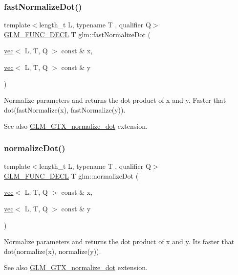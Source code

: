 \subsubsection{\texorpdfstring{fast\+Normalize\+Dot()}{fastNormalizeDot()}}
{\footnotesize\ttfamily template$<$length\+\_\+t L, typename T , qualifier Q$>$ \\
\mbox{\hyperlink{setup_8hpp_ab2d052de21a70539923e9bcbf6e83a51}{G\+L\+M\+\_\+\+F\+U\+N\+C\+\_\+\+D\+E\+CL}} T glm\+::fast\+Normalize\+Dot (\begin{DoxyParamCaption}\item[{\mbox{\hyperlink{structglm_1_1vec}{vec}}$<$ L, T, Q $>$ const \&}]{x,  }\item[{\mbox{\hyperlink{structglm_1_1vec}{vec}}$<$ L, T, Q $>$ const \&}]{y }\end{DoxyParamCaption})}

Normalize parameters and returns the dot product of x and y. Faster that dot(fast\+Normalize(x), fast\+Normalize(y)).

\begin{DoxySeeAlso}{See also}
\mbox{\hyperlink{group__gtx__normalize__dot}{G\+L\+M\+\_\+\+G\+T\+X\+\_\+normalize\+\_\+dot}} extension. 
\end{DoxySeeAlso}
\mbox{\label{group__gtx__normalize__dot_gacb140a2b903115d318c8b0a2fb5a5daa}} 
\subsubsection{\texorpdfstring{normalize\+Dot()}{normalizeDot()}}
{\footnotesize\ttfamily template$<$length\+\_\+t L, typename T , qualifier Q$>$ \\
\mbox{\hyperlink{setup_8hpp_ab2d052de21a70539923e9bcbf6e83a51}{G\+L\+M\+\_\+\+F\+U\+N\+C\+\_\+\+D\+E\+CL}} T glm\+::normalize\+Dot (\begin{DoxyParamCaption}\item[{\mbox{\hyperlink{structglm_1_1vec}{vec}}$<$ L, T, Q $>$ const \&}]{x,  }\item[{\mbox{\hyperlink{structglm_1_1vec}{vec}}$<$ L, T, Q $>$ const \&}]{y }\end{DoxyParamCaption})}

Normalize parameters and returns the dot product of x and y. It\textquotesingle{}s faster that dot(normalize(x), normalize(y)).

\begin{DoxySeeAlso}{See also}
\mbox{\hyperlink{group__gtx__normalize__dot}{G\+L\+M\+\_\+\+G\+T\+X\+\_\+normalize\+\_\+dot}} extension. 
\end{DoxySeeAlso}
